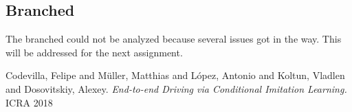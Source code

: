 \documentclass[a4paper]{article}
\begin{document}

  \subsection{Branched}

The branched could not be analyzed because several issues got in the way. This
will be addressed for the next assignment.

\begin{thebibliography}{9}
Codevilla, Felipe and Müller, Matthias and López, Antonio and Koltun, Vladlen
and Dosovitskiy, Alexey.
\textit{End-to-end Driving via Conditional Imitation Learning.}
ICRA 2018
\end{thebibliography}
\end{document}
